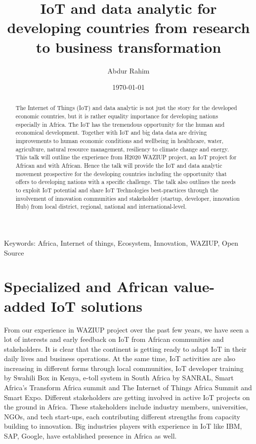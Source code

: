 \documentclass{llncs}
\begin{document}
\title{IoT and data analytic for developing countries from research to business transformation}

\author{Abdur Rahim}		 



\date{\today}

\maketitle

\begin{abstract}

The Internet of Things (IoT) and data analytic is not just the story for the developed economic countries, but it is rather equality importance for developing nations especially in Africa.
The IoT has the tremendous opportunity for the human and economical development.
Together with IoT and big data data are driving improvements to human economic conditions and wellbeing in healthcare, water, agriculture, natural resource management, resiliency to climate change and energy.
This talk will outline the experience from H2020 WAZIUP project, an IoT project for African and with African.
Hence the talk will provide the IoT and data analytic movement prospective for the developing countries including the opportunity that offers to developing nations with a specific challenge.
The talk also outlines the needs to exploit IoT potential and share IoT Technologies best-practices through the involvement of innovation communities and stakeholder (startup, developer, innovation Hub) from local district, regional, national and international-level.
\end{abstract}

Keywords: Africa, Internet of things, Ecosystem, Innovation, WAZIUP, Open Source

\section{Specialized and African value-added IoT solutions}

From our experience in WAZIUP project over the past few years, we have seen a lot of interests and early feedback on IoT from African communities and stakeholders.
It is clear that the continent is getting ready to adapt IoT in their daily lives and business operations.
At the same time, IoT activities are also increasing in different forms through local communities, IoT developer training by Swahili Box in Kenya, e-toll system in South Africa by SANRAL, Smart Africa’s Transform Africa summit and The Internet of Things Africa Summit and Smart Expo.
Different stakeholders are getting involved in active IoT projects on the ground in Africa.
These stakeholders include industry members, universities, NGOs, and tech start-ups, each contributing different strengths from capacity building to innovation.
Big industries players with experience in IoT like IBM, SAP, Google, have established presence in Africa as well.
\end{document}
